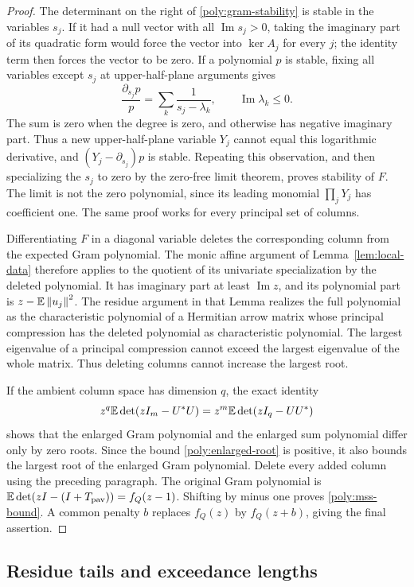 \begin{proof}
The determinant on the right of \eqref{poly:gram-stability} is stable
in the variables $s_j$. If it had a null vector with all
$\operatorname{Im}s_j>0$, taking the imaginary part of its quadratic
form would force the vector into $\ker A_j$ for every $j$; the identity
term then forces the vector to be zero. If a polynomial $p$ is stable,
fixing all variables except $s_j$ at upper-half-plane arguments gives
\[
 \frac{\partial_{s_j}p}{p}=
 \sum_k\frac{1}{s_j-\lambda_k},\qquad
 \operatorname{Im}\lambda_k\leq0.
\]
The sum is zero when the degree is zero, and otherwise has negative
imaginary part. Thus a new upper-half-plane variable $Y_j$ cannot equal
this logarithmic derivative, and
$(Y_j-\partial_{s_j})p$ is stable. Repeating this observation, and then
specializing the $s_j$ to zero by the zero-free limit theorem, proves
stability of $F$. The limit is not the zero polynomial, since its
leading monomial $\prod_jY_j$ has coefficient one. The same proof
works for every principal set of columns.

Differentiating $F$ in a diagonal variable deletes the corresponding
column from the expected Gram polynomial. The monic affine argument
of Lemma~\ref{lem:local-data} therefore applies to the quotient of its
univariate specialization by the deleted polynomial. It has
imaginary part at least $\operatorname{Im}z$, and its polynomial part
is $z-\mathbb E\left\lVert u_j\right\rVert^2$. The residue argument in that Lemma realizes
the full polynomial as the characteristic polynomial of a Hermitian
arrow matrix whose principal compression has the deleted polynomial
as characteristic polynomial. The largest eigenvalue of a principal
compression cannot exceed the largest eigenvalue of the whole matrix.
Thus deleting columns cannot increase the largest root.

If the ambient column space has dimension $q$, the exact identity
\[
 z^q\mathbb E\det(zI_m-U^*U)
   =z^m\mathbb E\det(zI_q-UU^*)
\]
shows that the enlarged Gram polynomial and the enlarged sum polynomial
differ only by zero roots. Since the bound
\eqref{poly:enlarged-root} is positive, it also bounds the largest
root of the enlarged Gram polynomial. Delete every added column using
the preceding paragraph. The original Gram polynomial is
$\mathbb E\det(zI-(I+T_{\mathrm{pav}}))=f_Q(z-1)$.
Shifting by minus one proves \eqref{poly:mss-bound}. A common penalty
$b$ replaces $f_Q(z)$ by $f_Q(z+b)$, giving the final assertion.
\end{proof}

\subsection{Residue tails and exceedance lengths}


